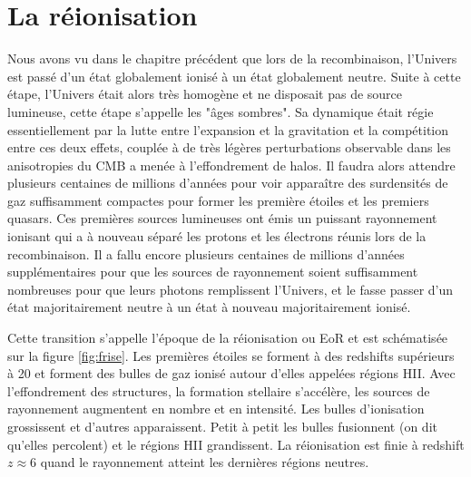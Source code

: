 
\chapter{La réionisation} 
\label{sec:introreio}

%
%
%
%



Nous avons vu dans le chapitre précédent que lors de la recombinaison, l'Univers est passé d'un état globalement ionisé à un état globalement neutre.
Suite à cette étape, l'Univers était alors très homogène et ne disposait pas de source lumineuse, cette étape s'appelle les "âges sombres".
Sa dynamique était régie essentiellement par la lutte entre l'expansion et la gravitation et la compétition entre ces deux effets, couplée à de très légères perturbations observable dans les anisotropies du \ac{CMB} a menée à l'effondrement de halos.
Il faudra alors attendre plusieurs centaines de millions d'années pour voir apparaître des surdensités de gaz suffisamment compactes pour former les première étoiles et les premiers quasars.
Ces premières sources lumineuses ont émis un puissant rayonnement ionisant qui a à nouveau séparé les protons et les électrons réunis lors de la recombinaison.
Il a fallu encore plusieurs centaines de millions d'années supplémentaires pour que les sources de rayonnement soient suffisamment nombreuses pour que leurs photons remplissent l'Univers, et le fasse passer d'un état majoritairement neutre à un état à nouveau majoritairement ionisé.

Cette transition s'appelle l’époque de la réionisation ou \ac{EoR} et est schématisée sur la figure \ref{fig:frise}.
Les premières étoiles se forment à des redshifts supérieurs à 20 et forment des bulles de gaz ionisé autour d'elles appelées régions HII.
Avec l’effondrement des structures, la formation stellaire s'accélère, les sources de rayonnement augmentent en nombre et en intensité.
Les bulles d'ionisation grossissent et d'autres apparaissent.
Petit à petit les bulles fusionnent (on dit qu'elles percolent) et le régions HII grandissent.
La réionisation est finie à redshift $z\approx 6$ quand le rayonnement atteint les dernières régions neutres.

